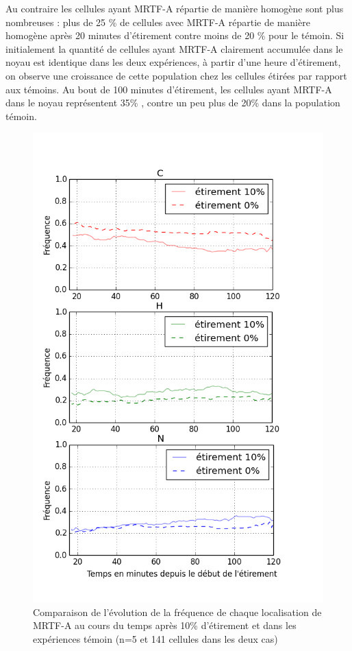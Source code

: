 Au contraire les cellules ayant MRTF-A répartie de manière homogène sont plus nombreuses : plus de 25 \% de cellules avec MRTF-A répartie de manière homogène après 20 minutes d'étirement contre moins de 20  \% pour le témoin. 
Si initialement la quantité de cellules ayant MRTF-A clairement accumulée dans le noyau est identique dans les deux expériences, à partir d'une heure d'étirement, on observe une croissance de cette population chez les cellules étirées par rapport aux témoins. Au bout de 100 minutes d'étirement, les cellules ayant MRTF-A dans le noyau représentent 35\% , contre un peu plus de 20\% dans la population témoin. 



\begin{figure}
\includegraphics[scale=0.5]{Figures/Etirement10_vs_0_dynamique.png} 
\caption{\label{CHN_dyn_Et10} Comparaison de l'évolution de la fréquence de chaque localisation de MRTF-A au cours du temps après 10\% d'étirement et dans les expériences témoin (n=5 et 141 cellules dans les deux cas)}
\end{figure}

